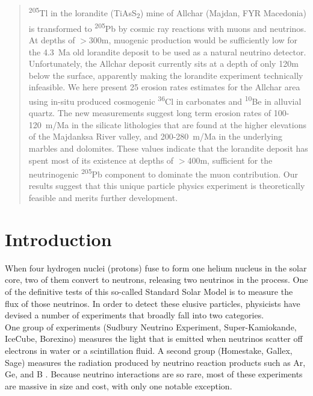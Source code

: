\documentclass[titlepage]{article}
\begin{document}
\begin{abstract}
  \textsuperscript{205}Tl in the lorandite (TiAsS\textsubscript{2})
  mine of Allchar (Majdan, FYR Macedonia) is transformed to
  \textsuperscript{205}Pb by cosmic ray reactions with muons and
  neutrinos.  At depths of $>$300m, muogenic production would be
  sufficiently low for the 4.3~Ma old lorandite deposit to be used as
  a natural neutrino detector.  Unfortunately, the Allchar deposit
  currently sits at a depth of only 120m below the surface, apparently
  making the lorandite experiment technically infeasible.  We here
  present 25 erosion rates estimates for the Allchar area using
  in-situ produced cosmogenic \textsuperscript{36}Cl in carbonates and
  \textsuperscript{10}Be in alluvial quartz. The new measurements
  suggest long term erosion rates of 100-120~m/Ma in the silicate
  lithologies that are found at the higher elevations of the Majdanksa
  River valley, and 200-280~m/Ma in the underlying marbles and
  dolomites. These values indicate that the lorandite deposit has
  spent most of its existence at depths of $>$400m, sufficient for the
  neutrinogenic \textsuperscript{205}Pb component to dominate the muon
  contribution.  Our results suggest that this unique particle physics
  experiment is theoretically feasible and merits further development.
\end{abstract}

\section{Introduction}

When four hydrogen nuclei (protons) fuse to form one helium nucleus in
the solar core, two of them convert to neutrons, releasing two
neutrinos in the process. One of the definitive tests of this
so-called Standard Solar Model is to measure the flux of those
neutrinos. In order to detect these elusive particles, physicists have
devised a number of experiments that broadly fall into two
categories.\\

One group of experiments (Sudbury Neutrino Experiment,
Super-Kamiokande, IceCube, Borexino) measures the light that is
emitted when neutrinos scatter off electrons in water or a
scintillation fluid. A second group (Homestake, Gallex, Sage) measures
the radiation produced by neutrino reaction products such as Ar, Ge,
and B \citep{bahcall1996}. Because neutrino interactions are so rare,
most of these experiments are massive in size and cost, with only one
notable exception.\\
\end{document}

